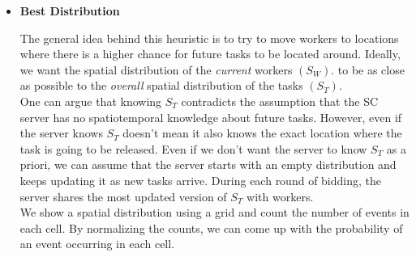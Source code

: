 \begin{itemize}
\item \textbf{Best Distribution}

The general idea behind this heuristic is to try to move workers to locations where there is a higher chance for future tasks to be located around. Ideally, we want the spatial distribution of the \textit{current} workers $(S_W)$. to be as close as possible to the \textit{overall} spatial distribution of the tasks $(S_T)$.\\
One can argue that knowing $S_T$ contradicts the assumption that the SC server has no spatiotemporal knowledge about future tasks. However, even if the server knows $S_T$ doesn't mean it also knows the exact location where the task is going to be released. Even if we don't want the server to know $S_T$ as a priori, we can assume that the server starts with an empty distribution and keeps updating it as new tasks arrive. During each round of bidding, the server shares the most updated version of $S_T$ with workers.\\
We show a spatial distribution using a grid and count the number of events in each cell. By normalizing the counts, we can come up with the probability of an event occurring in each cell.





\end{itemize}

